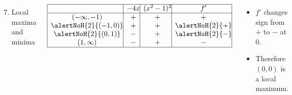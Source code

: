 \begin{frame}[t]
\begin{example}
\begin{columns}[t]
\begin{enumerate}
\setcounter{enumi}{6}
\item  Local maxima and minima
\end{enumerate}
\[
\begin{array}{|c@{}|c@{}|c@{}|c@{}|}
\hline
& -4x & (x^2-1)^2 & f' \\
\hline
(-\infty , -1) & + & + & + \\
\alertNoH{ 2}{(-1 , 0)} & + & + & \alertNoH{ 2}{+} \\
\alertNoH{ 2}{(0 , 1)} & - & + & \alertNoH{ 2}{-} \\
(1 , \infty) & - & + & - \\
\hline
\end{array}
\]
\begin{itemize}
\item<2->  $f'$ changes sign from $+$ to $-$ at $0$.
\item<3->  Therefore $(0,0)$ is a local maximum.
\end{itemize}
\end{columns}
\end{example}

\vskip 5cm
\end{frame}

